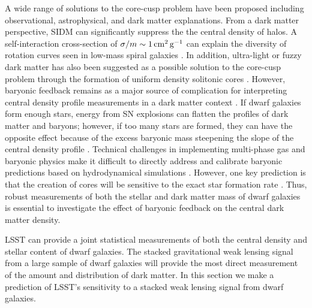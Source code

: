 A wide range of solutions to the core-cusp problem have been proposed including observational, astrophysical, and dark matter explanations.
From a dark matter perspective, SIDM can significantly suppress the the central density of halos.
A self-interaction cross-section of $\sigma / m \sim 1 \mathrm{\,cm}^2 \mathrm{\,g}^{-1}$ can explain the diversity of rotation curves seen in low-mass spiral galaxies \citep[\eg][]{1504.01437,2017PhRvL.119k1102K,1705.02358}.
In addition, ultra-light or fuzzy dark matter has also been suggested as a possible solution to the core-cusp problem through the formation of uniform density solitonic cores \citep[\eg][]{1502.03456,Hui:2017}. 
However, baryonic feedback remains as a major source of complication for interpreting central density profile measurements in a dark matter context \citep{Madau:2014,Read:2016}. 
If dwarf galaxies form enough stars, energy from SN explosions can flatten the profiles of dark matter and baryons; however, if too many stars are formed, they can have the opposite effect because of the excess baryonic mass steepening the slope of the central density profile \citep{Bullock:2017}.
Technical challenges in implementing multi-phase gas and baryonic physics make it difficult to directly address and calibrate baryonic predictions based on hydrodynamical simulations \citep{Tollet:2016,1611.02281,Sawala:2016}.
However, one key prediction is that the creation of cores will be sensitive to the exact star formation rate \citep[\eg][]{governato2012,dicintio2014,onorbe2015,Read:2016,read2018}.
Thus, robust measurements of both the stellar and dark matter mass of dwarf galaxies is essential to investigate the effect of baryonic feedback on the central dark matter density.

LSST can provide a joint statistical measurements of both the central density and stellar content of dwarf galaxies. 
The stacked gravitational weak lensing signal from a large sample of dwarf galaxies will provide the most direct measurement of the amount and distribution of dark matter.  
In this section we make a prediction of LSST's sensitivity to a stacked weak lensing signal from dwarf galaxies.

